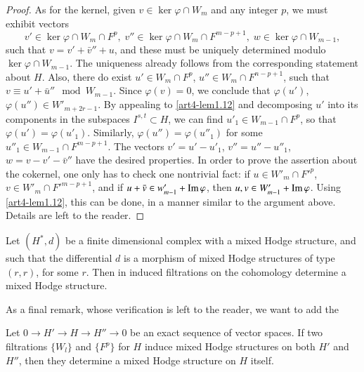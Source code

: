 \begin{proof}
As for the kernel, given $v \in \ker \varphi \cap W_m$ and any integer $p$, we must exhibit vectors
$$
v'\in \ker \varphi \cap W_m \cap F^p, \; v'' \in \ker \varphi \cap W_m \cap F^{m-p+1}, \; w \in \ker \varphi \cap W_{m-1},
$$
such that $v = v' + \bar{v}''+u$, and these must be uniquely determined modulo $\ker \varphi \cap W_{m-1}$. The uniqueness already follows from the corresponding statement about $H$. Also, there do exist $u'\in W_m \cap F^p$, $u'' \in W_m \cap F^{n-p+1}$, such that $v \equiv u' + \bar{u}'' \mod W_{m-1}$. Since $\varphi(v) = 0$, we conclude that $\varphi (u')$, $\varphi (u'') \in W'_{m+2r-1}$. By appealing to \ref{art4-lem1.12} and decomposing $u'$ into its components in the subspaces $I^{s,t} \subset H$, we can find $u'_1 \in W_{m-1} \cap F^p$, so that  $\varphi(u') = \varphi(u'_1)$. Similarly, $\varphi (u'') = \varphi (u''_1)$ for some $u''_1 \in W_{m-1} \cap F^{m-p+1}$. The vectors $v'= u'-u'_1$, $v''=u'' - u''_1$, $w = v - v'-\bar{v}''$ have the desired properties. In order to prove the assertion about the cokernel, one only has to check one nontrivial fact: if $u \in W'_m \cap F'^p$, $v \in W'_m \cap F'^{m-p+1}$, and if $u + \bar{v} \in w'_{m-1} +\operatorname{Im} \varphi$, then $u, v\in W'_{m-1} + \operatorname{Im} \varphi$. Using \ref{art4-lem1.12}, this can be done, in a manner similar to the argument above. Details are left to the reader.
\end{proof}

\setcounter{coro}{14}
\begin{coro}\label{art4-coro1.15}
Let $(H^\ast, d)$ be a finite dimensional complex with a mixed Hodge structure, and such that the differential $d$ is a morphism of mixed Hodge structures of type $(r,r)$, for some $r$. Then in induced filtrations on the cohomology determine a mixed Hodge structure.
\end{coro}

As a final remark, whose verification is left to the reader, we want to add the 

\setcounter{observation}{15}
\begin{observation}\label{art4-obser1.16}
Let $0 \to H' \to H \to H'' \to 0$ be an exact sequence of vector spaces. If two filtrations $\{W_l\}$ and $\{F^p\}$ for $H$ induce mixed Hodge structures on both $H'$ and $H''$, then they determine a mixed Hodge structure on $H$ itself.
\end{observation}

